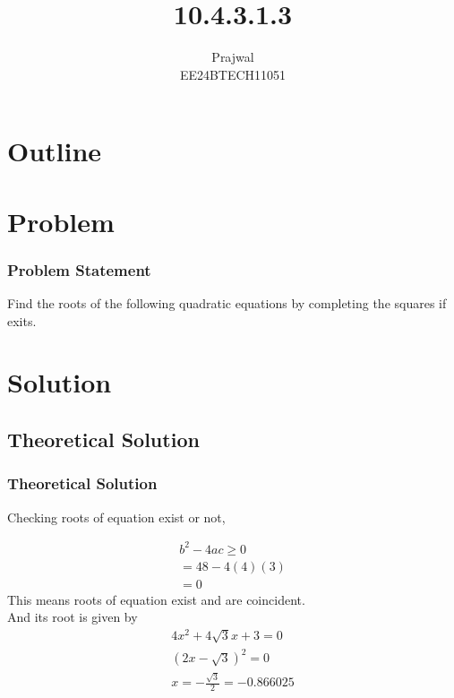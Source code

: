 \documentclass{beamer}
\title{10.4.3.1.3}
\author{Prajwal \\ EE24BTECH11051}
\theoremstyle{remark}
\numberwithin{equation}{section}
\begin{document}
\begin{frame}
\titlepage
\end{frame}
\section*{Outline}
\begin{frame}
\tableofcontents
\end{frame}
\section{Problem}
\begin{frame}
\frametitle{Problem Statement}
Find the roots of the following quadratic equations by completing the squares if exits.
\end{frame}
\section{Solution}
\subsection{Theoretical Solution}
\begin{frame}
\frametitle{Theoretical Solution}
    Checking roots of equation exist or not,

    \begin{align}
    b^2 - 4ac \geq 0 \\
    = 48 - 4(4)(3)\\
    = 0 
    \end{align}
    This means roots of equation exist and are coincident.\\
    And its root is given by 
    \begin{align}
    4x^2 + 4\sqrt{3}x + 3 = 0 \\
    (2x-\sqrt{3})^2 = 0 \\
    x = -\frac{\sqrt{3}}{2}=-0.866025
    \end{align} 
\end{frame}
\end{document}
